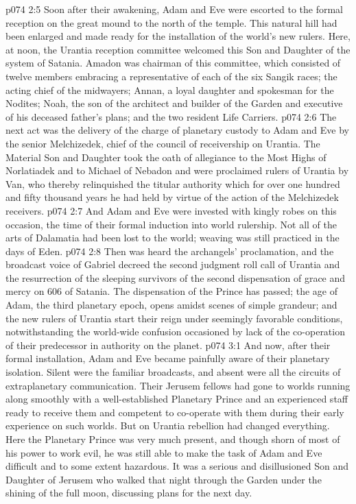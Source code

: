 \pc \vs p074 2:5 Soon after their awakening, Adam and Eve were escorted to the formal reception on the great mound to the north of the temple. This natural hill had been enlarged and made ready for the installation of the world’s new rulers. Here, at noon, the Urantia reception committee welcomed this Son and Daughter of the system of Satania. Amadon was chairman of this committee, which consisted of twelve members embracing a representative of each of the six Sangik races; the acting chief of the midwayers; Annan, a loyal daughter and spokesman for the Nodites; Noah, the son of the architect and builder of the Garden and executive of his deceased father’s plans; and the two resident Life Carriers.
\vs p074 2:6 The next act was the delivery of the charge of planetary custody to Adam and Eve by the senior Melchizedek, chief of the council of receivership on Urantia. The Material Son and Daughter took the oath of allegiance to the Most Highs of Norlatiadek and to Michael of Nebadon and were proclaimed rulers of Urantia by Van, who thereby relinquished the titular authority which for over one hundred and fifty thousand years he had held by virtue of the action of the Melchizedek receivers.\plusone
\vs p074 2:7 And Adam and Eve were invested with kingly robes on this occasion, the time of their formal induction into world rulership. Not all of the arts of Dalamatia had been lost to the world; weaving was still practiced in the days of Eden.
\vs p074 2:8 Then was heard the archangels’ proclamation, and the broadcast voice of Gabriel decreed the second judgment roll call of Urantia and the resurrection of the sleeping survivors of the second dispensation of grace and mercy on 606 of Satania. The dispensation of the Prince has passed; the age of Adam, the third planetary epoch, opens amidst scenes of simple grandeur; and the new rulers of Urantia start their reign under seemingly favorable conditions, notwithstanding the world\hyp{}wide confusion occasioned by lack of the co\hyp{}operation of their predecessor in authority on the planet.
\vs p074 3:1 And now, after their formal installation, Adam and Eve became painfully aware of their planetary isolation. Silent were the familiar broadcasts, and absent were all the circuits of extraplanetary communication. Their Jerusem fellows had gone to worlds running along smoothly with a well\hyp{}established Planetary Prince and an experienced staff ready to receive them and competent to co\hyp{}operate with them during their early experience on such worlds. But on Urantia rebellion had changed everything. Here the Planetary Prince was very much present, and though shorn of most of his power to work evil, he was still able to make the task of Adam and Eve difficult and to some extent hazardous. It was a serious and disillusioned Son and Daughter of Jerusem who walked that night through the Garden under the shining of the full moon, discussing plans for the next day.
